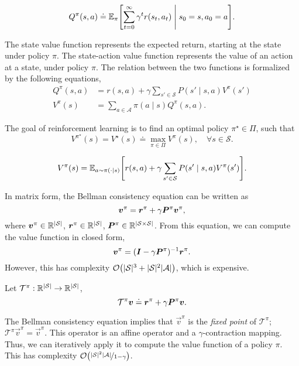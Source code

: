 \begin{definition}
    \[
        Q^\pi(s,a) \doteq \E_\pi \lft[ \sum_{t=0}^{\infty} \gamma^t r(s_t,a_t) \;\middle|\; s_0 = s, a_0 = a \rgt].
    \]
\end{definition}

The state value function represents the expected return, starting at the state under policy $\pi$.
The state-action value function represents the value of an action at a state, under policy $\pi$.
The relation between the two functions is formalized by the following equations,
\begin{align*}
    Q^\pi(s,a) & = r(s,a) + \gamma \sum_{s'\in \mathcal{S}} P(s'\mid s,a) V^\pi(s') \\
    V^\pi(s)   & = \sum_{a\in \mathcal{A}} \pi(a\mid s) Q^\pi(s,a).
\end{align*}

\begin{important}
    The goal of reinforcement learning is to find an optimal policy $\pi^\star \in \Pi$, such that \[
        V^{\pi^\star}(s) = V^\star(s) \doteq \max_{\pi \in \Pi} V^\pi(s), \quad \forall s \in \mathcal{S}.
    \]
\end{important}

\begin{theorem}
    \[
        V^\pi(s) = \E_{a\sim \pi(\cdot \mid s)} \lft[ r(s,a) + \gamma \sum_{s'\in \mathcal{S}} P(s'\mid s,a) V^\pi(s') \rgt].
    \]
\end{theorem}

In matrix form, the Bellman consistency equation can be written as \[
    \bm{v}^\pi = \bm{r}^\pi + \gamma \bm{P}^\pi \bm{v}^\pi,
\]
where $\bm{v}^\pi \in \mathbb{R}^{|\mathcal{S}|}$, $\bm{r}^\pi \in \mathbb{R}^{|\mathcal{S}|}$, $\bm{P}^\pi \in
    \mathbb{R}^{|\mathcal{S}\times \mathcal{S}|}$. From this equation, we can compute the value function in
closed form, \[
    \bm{v}^\pi = (\bm{I} - \gamma \bm{P}^\pi)^{-1} \bm{r}^\pi.
\]
However, this has complexity $\bigo{|\mathcal{S}|^3 + |\mathcal{S}|^2 |\mathcal{A}|}$, which is
expensive.

\begin{definition}
    Let $\mathcal{T}^\pi: \mathbb{R}^{|\mathcal{S}|} \to \mathbb{R}^{|\mathcal{S}|}$, \[
        \mathcal{T}^\pi \bm{v} \doteq \bm{r}^\pi + \gamma \bm{P}^\pi \bm{v}.
    \]
\end{definition}

The Bellman consistency equation implies that $\vec{v}^\pi$ is the \textit{fixed point} of
$\mathcal{T}^\pi$; $\mathcal{T}^\pi \vec{v}^\pi = \vec{v}^\pi$. This operator is an affine operator
and a $\gamma$-contraction mapping. Thus, we can iteratively apply it to compute the value function
of a policy $\pi$. This has complexity $\bigo{\nicefrac{|\mathcal{S}|^2|\mathcal{A}|}{1-\gamma}}$.

